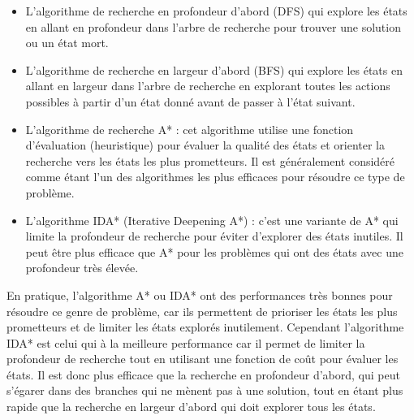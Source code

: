 \documentclass{article}
\begin{document}
\begin{itemize}
\item L'algorithme de recherche en profondeur d'abord (DFS) qui explore les états en allant en profondeur dans l'arbre de recherche pour trouver une solution ou un état mort.
\item L'algorithme de recherche en largeur d'abord (BFS) qui explore les états en allant en largeur dans l'arbre de recherche en explorant toutes les actions possibles à partir d'un état donné avant de passer à l'état suivant.
\item L'algorithme de recherche A* : cet algorithme utilise une fonction d'évaluation (heuristique) pour évaluer la qualité des états et orienter la recherche vers les états les plus prometteurs. Il est généralement considéré comme étant l'un des algorithmes les plus efficaces pour résoudre ce type de problème.
\item L'algorithme IDA* (Iterative Deepening A*) : c'est une variante de A* qui limite la profondeur de recherche pour éviter d'explorer des états inutiles. Il peut être plus efficace que A* pour les problèmes qui ont des états avec une profondeur très élevée.
\end{itemize}
\par En pratique, l'algorithme A* ou IDA* ont des performances très bonnes pour résoudre ce genre de problème, car ils permettent de prioriser les états les plus prometteurs et de limiter les états explorés inutilement. Cependant l'algorithme IDA* est celui qui à la meilleure performance car il permet de limiter la profondeur de recherche tout en utilisant une fonction de coût pour évaluer les états. Il est donc plus efficace que la recherche en profondeur d'abord, qui peut s'égarer dans des branches qui ne mènent pas à une solution, tout en étant plus rapide que la recherche en largeur d'abord qui doit explorer tous les états.
\end{document}
